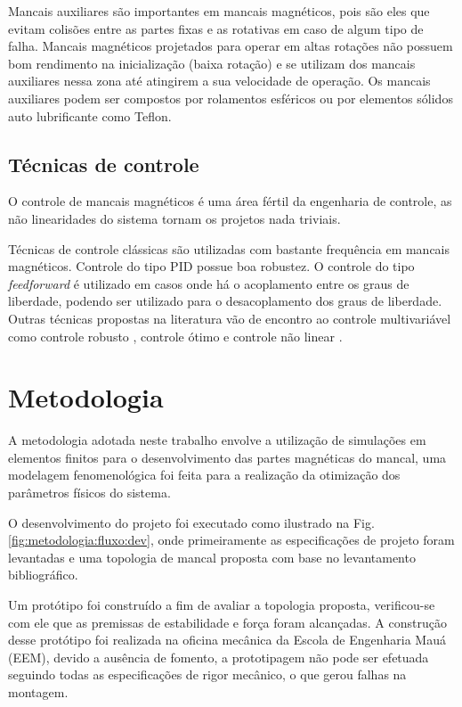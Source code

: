  Mancais auxiliares são importantes em mancais magnéticos, pois são eles que evitam colisões entre as partes fixas e as rotativas em caso de algum tipo de falha. Mancais magnéticos projetados para operar em altas rotações não possuem bom rendimento na inicialização  (baixa rotação) e se utilizam dos mancais auxiliares nessa zona até atingirem a sua velocidade de operação. Os mancais auxiliares podem ser compostos por rolamentos esféricos \citep{Sun2004a} ou por elementos sólidos auto lubrificante como Teflon.
 
\subsection{Técnicas de controle}

O controle de mancais magnéticos é uma área fértil da engenharia de controle, as não linearidades do sistema tornam os projetos nada triviais.  

Técnicas de controle clássicas são utilizadas com bastante frequência em mancais magnéticos. Controle do tipo PID \citep{Tezuka2013} possue boa robustez. O controle  do tipo \textit{feedforward} é utilizado em casos onde há o acoplamento entre os graus de liberdade, podendo ser utilizado para o desacoplamento dos graus de liberdade. Outras técnicas propostas na literatura vão de encontro ao controle multivariável como controle robusto \citep{Jimenez-Lizafrraga2007}, controle ótimo \citep{Schuhmann2012} e controle não linear \citep{Rundell1996}.


\section{Metodologia}

A metodologia adotada neste trabalho envolve a utilização de simulações em elementos finitos para o desenvolvimento das partes magnéticas do mancal, uma modelagem fenomenológica foi feita para a realização da otimização dos parâmetros físicos do sistema. 

O desenvolvimento do projeto foi executado como ilustrado na Fig. \ref{fig:metodologia:fluxo:dev}, onde primeiramente as especificações de projeto foram levantadas e uma topologia de mancal proposta com base no levantamento bibliográfico. 

Um protótipo foi construído a fim de avaliar a topologia proposta, verificou-se com ele que as premissas de estabilidade e força foram alcançadas. A construção desse protótipo foi realizada na oficina mecânica da Escola de Engenharia Mauá (EEM), devido a ausência de fomento, a prototipagem não pode ser efetuada seguindo todas as especificações de rigor mecânico, o que gerou falhas na montagem.

